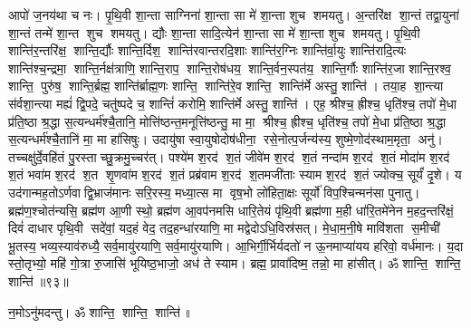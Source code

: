 आपो॑ ज॒नय॑था च नः। पृ॒थि॒वी शा॒न्ता साग्निना॑ शा॒न्ता सा मे॑ शा॒न्ता शुच शमयतु। अ॒न्तरि॑क्ष शा॒न्तं तद्वा॒युना॑ शा॒न्तं तन्मे॑ शा॒न्त शुच शमयतु। द्यौः  शा॒न्ता सादि॒त्येन॑ शा॒न्ता सा मे॑ शा॒न्ता शुच शमयतु। पृ॒थि॒वी शान्ति॑र॒न्तरि॑क्ष॒ शान्ति॒र्द्यौः  शान्ति॒र्दिश॒ शान्ति॑रवान्तरदि॒शाः  शान्ति॑र॒ग्निः  शान्ति॑र्वा॒युः  शान्ति॑रादि॒त्यः  शान्ति॑श्च॒न्द्रमा॒ शान्ति॒र्नक्ष॑त्राणि॒ शान्ति॒राप॒ शान्ति॒रोष॑धय॒ शान्ति॒र्वन॒स्पत॑य॒ शान्ति॒र्गौः  शान्ति॑र॒जा शान्ति॒रश्व॒ शान्ति॒ पुरु॑ष॒ शान्ति॒र्ब्रह्म॒ शान्ति॑र्ब्राह्म॒णः  शान्ति॒ शान्ति॑रे॒व शान्ति॒ शान्ति॑र्मे अस्तु॒ शान्ति॑। तया॒ह शा॒न्त्या स॑र्वशा॒न्त्या मह्यं॑ द्वि॒पदे॒ चतु॑ष्पदे च॒ शान्तिं॑ करोमि॒ शान्ति॑र्मे अस्तु॒ शान्ति॑। एह॒ श्रीश्च॒ ह्रीश्च॒ धृति॑श्च॒ तपो॑ मे॒धा प्र॑ति॒ष्ठा श्र॒द्धा स॒त्यन्धर्म॑श्चै॒तानि॒ मोत्ति॑ष्ठन्त॒मनूत्ति॑ष्ठन्तु॒ मा मा॒ श्रीश्च॒ ह्रीश्च॒ धृति॑श्च॒ तपो॑ मे॒धा प्र॑ति॒ष्ठा श्र॒द्धा स॒त्यन्धर्म॑श्चै॒तानि॑ मा॒ मा हा॑सिषुः। उदायु॑षा स्वा॒युषोदोष॑धीना॒ रसे॒नोत्प॒र्जन्य॑स्य॒ शुष्मे॒णोद॑स्थाम॒मृता॒ अनु॑। तच्चक्षु॑र्दे॒वहि॑तं पु॒रस्ताच्छु॒क्रमु॒च्चर॑त्। पश्ये॑म श॒रद॑ श॒तं जीवे॑म श॒रद॑ श॒तं नन्दा॑म श॒रद॑ श॒तं मोदा॑म श॒रद॑ श॒तं भवा॑म श॒रद॑ श॒त शृ॒णवा॑म श॒रद॑ श॒तं प्रब्र॑वाम श॒रद॑ श॒तमजी॑ताः स्याम श॒रद॑ श॒तं ज्योक्च॒ सूर्यं॑ दृ॒शे। य उद॑गान्मह॒तोऽर्णवाद्वि॒भ्राज॑मानः सरि॒रस्य॒ मध्या॒त्स मा वृष॒भो लो॑हिता॒क्षः सूर्यो॑ विप॒श्चिन्मन॑सा पुनातु। ब्रह्म॑ण॒श्चोत॑न्यसि॒ ब्रह्म॑ण आ॒णी स्थो॒ ब्रह्म॑ण आ॒वप॑नमसि धारि॒तेयं पृ॑थि॒वी ब्रह्म॑णा म॒ही धा॑रि॒तमे॑नेन म॒हद॒न्तरि॑क्षं॒ दिवं॑ दाधार पृथि॒वी सदे॑वां॒ यद॒हं वेद॒ तद॒हन्धा॑रयाणि॒ मा मद्वेदोऽधि॒विस्र॑सत्। मे॒धा॒म॒नी॒षे मावि॑शता स॒मीची॑ भू॒तस्य॒ भव्य॒स्याव॑रुध्यै॒ सर्व॒मायु॑रयाणि॒ सर्व॒मायु॑रयाणि। आ॒भिर्गी॒र्भिर्यदतो॑ न ऊ॒नमाप्या॑यय हरिवो॒ वर्ध॑मानः। य॒दा स्तो॒तृभ्यो॒ महि॑ गो॒त्रा रु॒जासि॑ भूयिष्ठ॒भाजो॒ अध॑ ते स्याम। ब्रह्म॒ प्रावा॑दिष्म॒ तन्नो॒ मा हा॑सीत्। ॐ शान्ति॒ शान्ति॒ शान्ति॑॥९३॥\anuvakamend[प॒रा॒वतो॑ दधातु ब॒द्धां जिन्व॑थ दृ॒शे स॒प्त च॑]

न॒मोऽनु॑मदन्तु। ॐ शान्ति॒ शान्ति॒ शान्ति॑॥ 

\closesection